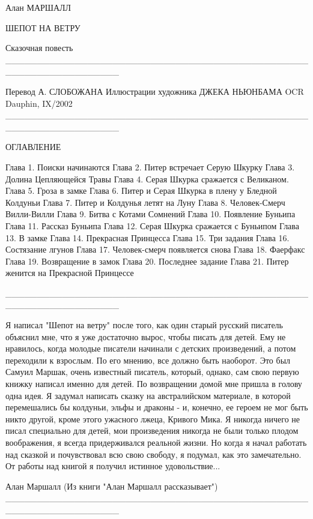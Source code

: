 Алан МАРШАЛЛ

                        ШЕПОТ НА ВЕТРУ

                       Сказочная повесть
__________________________________________________________________

Перевод А. СЛОБОЖАНА
Иллюстрации художника ДЖЕКА НЬЮНБАМА
OCR Dauphin, IX/2002
__________________________________________________________________

                ОГЛАВЛЕНИЕ

    Глава  1. Поиски начинаются
    Глава  2. Питер встречает Серую Шкурку
    Глава  3. Долина Цепляющейся Травы
    Глава  4. Серая Шкурка сражается с Великаном.
    Глава  5. Гроза в замке
    Глава  6. Питер и Серая Шкурка в плену у Бледной Колдуньи
    Глава  7. Питер и Колдунья летят на Луну
    Глава  8. Человек-Смерч Вилли-Вилли
    Глава  9. Битва с Котами Сомнений
    Глава 10. Появление Буньипа
    Глава 11. Рассказ Буньипа
    Глава 12. Серая Шкурка сражается с Буньипом
    Глава 13. В замке
    Глава 14. Прекрасная Принцесса
    Глава 15. Три задания
    Глава 16. Состязание лгунов
    Глава 17. Человек-смерч появляется снова
    Глава 18. Фаерфакс
    Глава 19. Возвращение в замок
    Глава 20. Последнее задание
    Глава 21. Питер женится на Прекрасной Принцессе

__________________________________________________________________

    Я написал "Шепот на ветру" после того, как один старый русский 
писатель объяснил мне, что я уже достаточно вырос, чтобы писать для 
детей. Ему не нравилось, когда молодые писатели начинали с детских 
произведений, а потом переходили к взрослым. По его мнению, все должно 
быть наоборот. Это был Самуил Маршак, очень известный писатель, 
который, однако, сам свою первую книжку написал именно для детей.
    По возвращении домой мне пришла в голову одна идея. Я задумал 
написать сказку на австралийском материале, в которой перемешались бы 
колдуньи, эльфы и драконы - и, конечно, ее героем не мог быть никто 
другой, кроме этого ужасного лжеца, Кривого Мика.
    Я никогда ничего не писал специально для детей, мои произведения 
никогда не были только плодом воображения, я всегда придерживался 
реальной жизни. Но когда я начал работать над сказкой и почувствовал 
всю свою свободу, я подумал, как это замечательно. От работы над 
книгой я получил истинное удовольствие...

                                                     Алан Маршалл
                                (Из книги "Алан Маршалл рассказывает")
__________________________________________________________________

